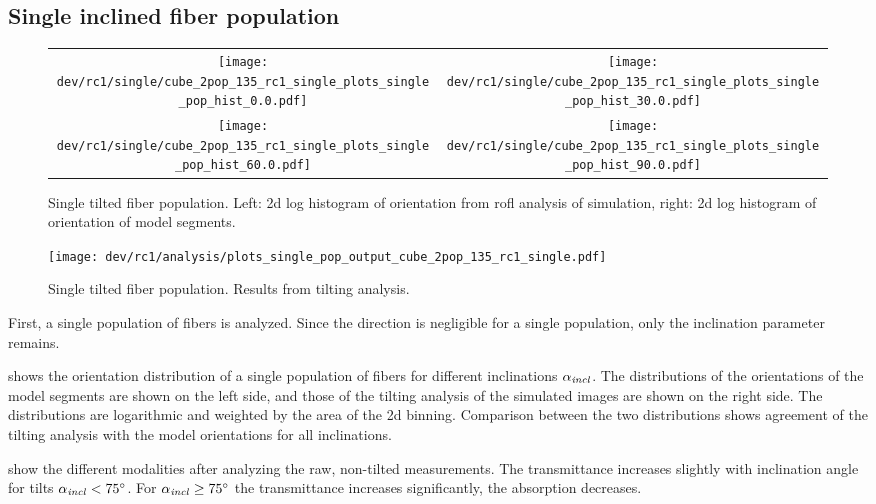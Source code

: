 \subsection{Single inclined fiber population}
\label{sec:resSingleIncl}
%
\begin{figure}[!t]
\centering
\setlength{\tikzwidth}{0.45\textwidth}
\begin{tabular}{c|c}
    \texttt{[image: dev/rc1/single/cube\_2pop\_135\_rc1\_single\_plots\_single\_pop\_hist\_0.0.pdf]}&
    \texttt{[image: dev/rc1/single/cube\_2pop\_135\_rc1\_single\_plots\_single\_pop\_hist\_30.0.pdf]}\\
    \texttt{[image: dev/rc1/single/cube\_2pop\_135\_rc1\_single\_plots\_single\_pop\_hist\_60.0.pdf]}&
    \texttt{[image: dev/rc1/single/cube\_2pop\_135\_rc1\_single\_plots\_single\_pop\_hist\_90.0.pdf]}
\end{tabular}
%
\caption[sim]{Single tilted fiber population. Left: 2d log histogram of orientation from rofl analysis of simulation, right: 2d log histogram of orientation of model segments. }
\label{fig:single_fiber_pop_hist}
\end{figure}
%
\begin{figure}[!p]
\centering
\texttt{[image: dev/rc1/analysis/plots\_single\_pop\_output\_cube\_2pop\_135\_rc1\_single.pdf]}
\caption[]{Single tilted fiber population. Results from tilting analysis.}
\label{fig:single_fiber_pop_rofl}
\end{figure}
%
First, a single population of fibers is analyzed.
Since the direction is negligible for a single population, only the inclination parameter \modelInc{} remains.
\par
%
 shows the orientation distribution of a single population of fibers for different inclinations $\textnormal{$\alpha_{\mathit{incl}}$}{}$.
The distributions of the orientations of the model segments are shown on the left side, and those of the tilting analysis of the simulated images are shown on the right side.
The distributions are logarithmic and weighted by the area of the 2d binning.
Comparison between the two distributions shows agreement of the tilting analysis with the model orientations for all inclinations.
\par
%
 show the different modalities after analyzing the raw, non-tilted measurements.
The transmittance increases slightly with inclination angle for tilts $\textnormal{$\alpha_{\mathit{incl}}$}<\SI{75}{\degree}$.
For $\textnormal{$\alpha_{\mathit{incl}}$} \ge \SI{75}{\degree}$ the transmittance increases significantly, \ie{} the absorption decreases.
